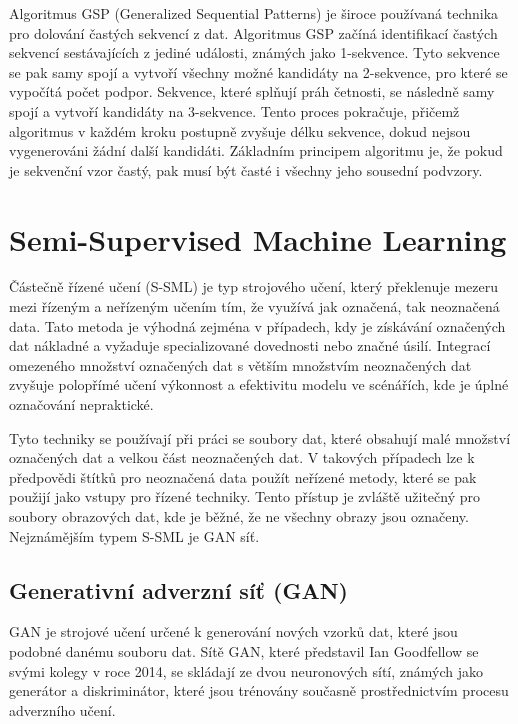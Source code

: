 \newpage

Algoritmus GSP (Generalized Sequential Patterns)\cite{Srikant1996} je široce používaná technika pro dolování častých sekvencí z dat. Algoritmus GSP začíná identifikací častých sekvencí sestávajících z jediné události, známých jako 1-sekvence. Tyto sekvence se pak samy spojí a vytvoří všechny možné kandidáty na 2-sekvence, pro které se vypočítá počet podpor. Sekvence, které splňují práh četnosti, se následně samy spojí a vytvoří kandidáty na 3-sekvence. Tento proces pokračuje, přičemž algoritmus v každém kroku postupně zvyšuje délku sekvence, dokud nejsou vygenerováni žádní další kandidáti. Základním principem algoritmu je, že pokud je sekvenční vzor častý, pak musí být časté i všechny jeho sousední podvzory.

\newpage

\section{Semi-Supervised Machine Learning}
Částečně řízené učení (S-SML) je typ strojového učení, který překlenuje mezeru mezi řízeným a neřízeným učením tím, že využívá jak označená, tak neoznačená data. Tato metoda je výhodná zejména v případech, kdy je získávání označených dat nákladné a vyžaduje specializované dovednosti nebo značné úsilí. Integrací omezeného množství označených dat s větším množstvím neoznačených dat zvyšuje polopřímé učení výkonnost a efektivitu modelu ve scénářích, kde je úplné označování nepraktické.

Tyto techniky se používají při práci se soubory dat, které obsahují malé množství označených dat a velkou část neoznačených dat. V takových případech lze k předpovědi štítků pro neoznačená data použít neřízené metody, které se pak použijí jako vstupy pro řízené techniky. Tento přístup je zvláště užitečný pro soubory obrazových dat, kde je běžné, že ne všechny obrazy jsou označeny. Nejznámějším typem S-SML je GAN síť.

\subsection{Generativní adverzní síť (GAN)}
GAN\cite{Goodfellow2021} je strojové učení určené k generování nových vzorků dat, které jsou podobné danému souboru dat. Sítě GAN, které představil Ian Goodfellow se svými kolegy v roce 2014, se skládají ze dvou neuronových sítí, známých jako generátor a diskriminátor, které jsou trénovány současně prostřednictvím procesu adverzního učení.

